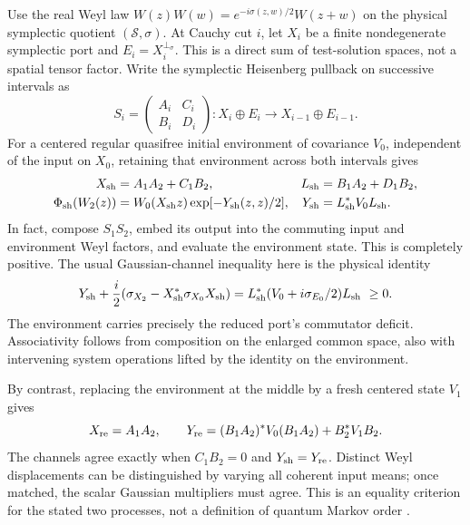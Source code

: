\documentclass[11pt]{article}
\newcommand{\Sp}{\mathcal S}
\begin{document}
Use the real Weyl law \(W(z)W(w)=e^{-i\sigma(z,w)/2}W(z+w)\) on the physical symplectic quotient \((\Sp,\sigma)\). At Cauchy cut \(i\), let \(X_i\) be a finite nondegenerate symplectic port and \(E_i=X_i^{\perp_\sigma}\). This is a direct sum of test-solution spaces, not a spatial tensor factor. Write the symplectic Heisenberg pullback on successive intervals as
\[
 S_i=\begin{pmatrix}A_i&C_i\\ B_i&D_i\end{pmatrix}
 : X_i\oplus E_i\longrightarrow X_{i-1}\oplus E_{i-1}.
\]
For a centered regular quasifree initial environment of covariance \(V_0\), independent of the input on \(X_0\), retaining that environment across both intervals gives
\begin{align}
 X_{\rm sh}&=A_1A_2+C_1B_2,&
 L_{\rm sh}&=B_1A_2+D_1B_2,\label{eq:shared}\\
 \Phi_{\rm sh}(W_2(z))
 &=W_0(X_{\rm sh}z)\exp[-Y_{\rm sh}(z,z)/2],&
 Y_{\rm sh}&=L_{\rm sh}^*V_0L_{\rm sh}.\nonumber
\end{align}
In fact, compose \(S_1S_2\), embed its output into the commuting input and environment Weyl factors, and evaluate the environment state. This is completely positive. The usual Gaussian-channel inequality \cite{caruso} here is the physical identity
\[
 Y_{\rm sh}+\frac i2(\sigma_{X_2}-X_{\rm sh}^*\sigma_{X_0}X_{\rm sh})
     =L_{\rm sh}^*(V_0+i\sigma_{E_0}/2)L_{\rm sh}\ \ge0.
\]
The environment carries precisely the reduced port's commutator deficit. Associativity follows from composition on the enlarged common space, also with intervening system operations lifted by the identity on the environment.

By contrast, replacing the environment at the middle by a fresh centered state \(V_1\) gives
\[
 X_{\rm re}=A_1A_2,\qquad
 Y_{\rm re}=(B_1A_2)^*V_0(B_1A_2)+B_2^*V_1B_2 .
\]
The channels agree exactly when \(C_1B_2=0\) and \(Y_{\rm sh}=Y_{\rm re}\). Distinct Weyl displacements can be distinguished by varying all coherent input means; once matched, the scalar Gaussian multipliers must agree. This is an equality criterion for the stated two processes, not a definition of quantum Markov order \cite{pollock}.
\end{document}

